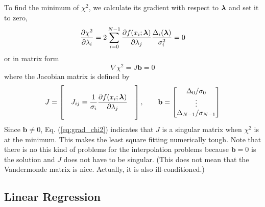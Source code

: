 To find the minimum of $\chi^2$, we calculate its gradient with respect to $\boldsymbol{\lambda}$ and set it to zero,
\begin{equation}
\frac{\partial \chi^2}{\partial \lambda_i} = 2 \sum_{i=0}^{N-1} \frac{\partial f(x_i;\boldsymbol{\lambda})}{\partial \lambda_j} \frac{\Delta_i(\boldsymbol{\lambda})}{\sigma_i^2}=0
\end{equation}
or in matrix form
\begin{equation}\label{eq:grad_chi2}
\nabla \chi^2 = J \mathbf{b} = 0
\end{equation}
where the Jacobian matrix is defined by
\begin{equation}
J = \begin{bmatrix} & & \\ & J_{ij}=\displaystyle\frac{1}{\sigma_i}\frac{\partial f(x_i;\boldsymbol{\lambda})}{\partial \lambda_j} & \\
& & \end{bmatrix}, \qquad 
\mathbf{b} = \begin{bmatrix} \Delta_0/\sigma_0\\ \vdots \\ \Delta_{N-1}/\sigma_{N-1} \end{bmatrix}
\end{equation}
Since $\mathbf{b} \ne 0$, Eq. (\ref{eq:grad_chi2}) indicates that $J$ is a singular matrix when $\chi^2$ is at the minimum.
This makes the least square fitting numerically tough.  Note that there is no this kind of problems for the interpolation problems because $\mathbf{b}=0$ is the solution and $J$ does not have to be singular. (This does not mean that the Vandermonde matrix is nice.  Actually, it is also ill-conditioned.)

\noindent
\subsection{Linear Regression}

